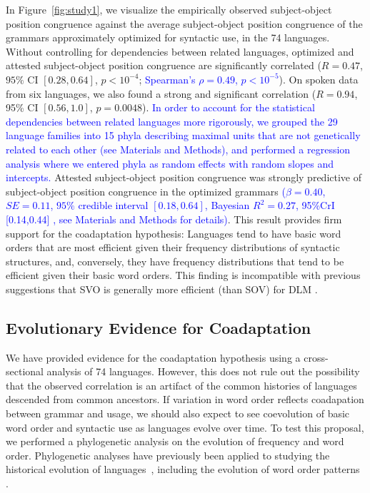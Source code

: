 \documentclass[9pt,twocolumn,twoside,lineno]{pnas-new}
\begin{document}
In Figure~\ref{fig:study1}, we visualize the empirically observed subject-object position congruence against the average subject-object position congruence of the grammars  approximately optimized for syntactic use, in the 74 languages.
Without controlling for dependencies between related languages, optimized and attested subject-object position congruence are significantly correlated ($R=0.47$, $95\%$ CI $[0.28, 0.64]$, $p<10^{-4}$; \textcolor{blue}{Spearman's $\rho=0.49$, $p < 10^{-5}$}). %
On spoken data from six languages, we also found a strong and significant correlation ($R=0.94$, 95\% CI $[0.56, 1.0]$, $p=0.0048$).
\textcolor{blue}{In order to account for the statistical dependencies between related languages more rigorously, we grouped the 29 language families into 15 phyla describing maximal units that are not genetically related to each other (see Materials and Methods), and performed a regression analysis where we entered phyla as random effects with random slopes and intercepts.}
Attested subject-object position congruence was strongly predictive of subject-object position congruence in the optimized grammars \textcolor{blue}{($\beta = 0.40$, $SE=0.11$, $95\%$ credible interval $[0.18, 0.64]$, Bayesian $R^2 = 0.27$, 95\%CrI [0.14,0.44] \cite{gelman2019r}, see Materials and Methods for details)}. %
This result provides firm support for the coadaptation hypothesis: Languages tend to have basic word orders that are most efficient given their frequency distributions of syntactic structures, and, conversely, they have frequency distributions that tend to be efficient given their basic word orders.
This finding is incompatible with previous suggestions that SVO is generally more efficient (than SOV) for DLM \citep{ferrer-i-cancho-placement-2017}.







\subsection*{Evolutionary Evidence for Coadaptation}
We have provided evidence for the coadaptation hypothesis using a cross-sectional analysis of 74 languages. %
However, this does not rule out the possibility that the observed correlation is an artifact of the common histories of languages descended from common ancestors.
If variation in word order reflects coadapation between grammar and usage, we should also expect to see coevolution of basic word order and syntactic use as languages evolve over time.
To test this proposal, we performed a phylogenetic analysis on the evolution of frequency and word order.
Phylogenetic analyses have previously been applied to studying the historical evolution of languages~\citep[e.g., ][]{gray2009language,greenhill2009austronesian,chang2015ancestry,sagart2019dated}, including the evolution of word order patterns \citep{dunn-evolved-2011, maurits2014tracing}.
\end{document}
